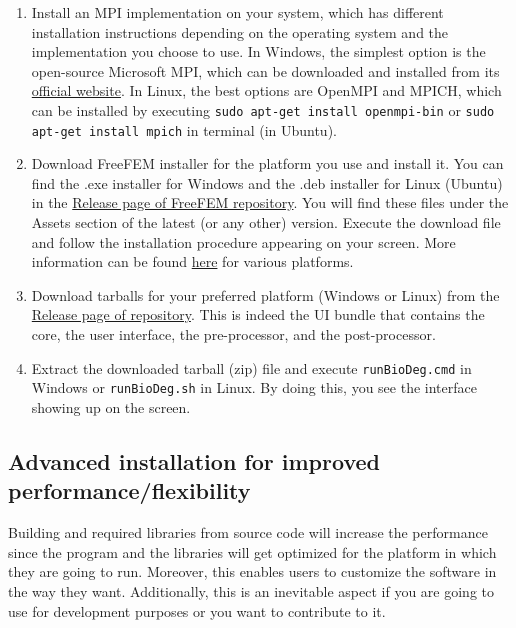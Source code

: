 \begin{enumerate}
\item
Install an MPI implementation on your system, which has different installation instructions depending on the operating system and the implementation you choose to use. In Windows, the simplest option is the open-source Microsoft MPI, which can be downloaded and installed from its \href{https://www.microsoft.com/en-us/download/details.aspx?id=100593}{official website}. In Linux, the best options are OpenMPI and MPICH, which can be installed by executing \verb|sudo apt-get install openmpi-bin| or \verb|sudo apt-get install mpich| in terminal (in Ubuntu).
\item
Download FreeFEM installer for the platform you use and install it. You can find the {.exe} installer for Windows and the {.deb} installer for Linux (Ubuntu) in the \href{https://github.com/FreeFem/FreeFem-sources/releases}{Release page of FreeFEM repository}. You will find these files under the Assets section of the latest (or any other) version. Execute the download file and follow the installation procedure appearing on your screen. More information can be found \href{https://doc.freefem.org/introduction/installation.html}{here} for various platforms.
\item
Download \biodeg{} tarballs for your preferred platform (Windows or Linux) from the \href{https://github.com/mbarzegary/BioDeg-UI/releases}{Release page of \biodeg{} repository}. This is indeed the \biodeg{} UI bundle that contains the \biodeg{} core, the user interface, the pre-processor, and the post-processor.
\item
Extract the downloaded tarball (zip) file and execute \verb|runBioDeg.cmd| in Windows or \verb|runBioDeg.sh| in Linux. By doing this, you see the \biodeg{} interface showing up on the screen.
\end{enumerate}




\subsection{Advanced installation for improved performance/flexibility}

Building \biodeg{} and required libraries from source code will increase the performance since the program and the libraries will get optimized for the platform in which they are going to run. Moreover, this enables users to customize the software in the way they want. Additionally, this is an inevitable aspect if you are going to use \biodeg{} for development purposes or you want to contribute to it.

